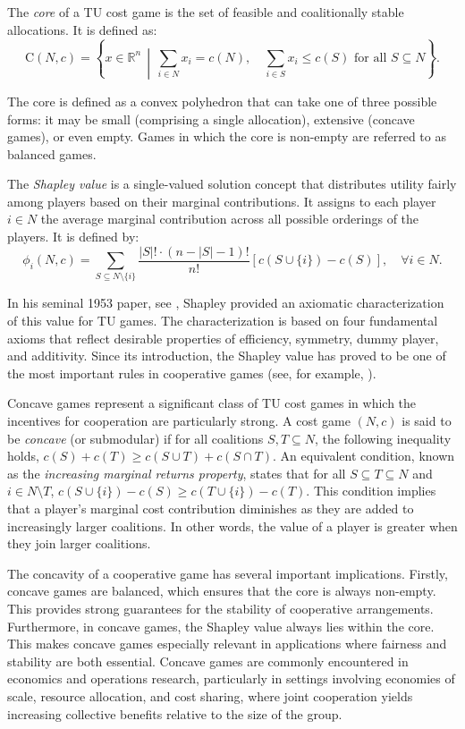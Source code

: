\documentclass[12pt]{article}
\begin{document}
\noindent The \textit{core} of a TU cost game is the set of feasible and coalitionally stable allocations. It is defined as:
\[
\text{C}(N,c) = \left\{ x \in \mathbb{R}^n \,\middle|\, \sum_{i \in N} x_i = c(N), \quad \sum_{i \in S} x_i \leq c(S) \text{ for all } S \subseteq N \right\}.
\]

\noindent The core is defined as a convex polyhedron that can take one of three possible forms: it may be small (comprising a single allocation), extensive (concave games), or even empty. Games in which the core is non-empty are referred to as balanced games.

\noindent The \textit{Shapley value} is a single-valued solution concept that distributes utility fairly among players based on their marginal contributions. It assigns to each player \( i \in N \) the average marginal contribution across all possible orderings of the players. It is defined by:
\[
\phi_i(N,c) = \sum_{S \subseteq N \setminus \{i\}} \frac{|S|! \cdot (n - |S| - 1)!}{n!} \left[ c(S \cup \{i\}) - c(S) \right], \quad \forall i \in N.
\]

\noindent In his seminal 1953 paper, see \cite{Shapley1953}, Shapley provided an axiomatic characterization of this value for TU games. The characterization is based on four fundamental axioms that reflect desirable properties of efficiency, symmetry, dummy player, and additivity. Since its introduction, the Shapley value has proved to be one of the most important rules in cooperative games (see, for example, \cite{flores2019evaluating}).

\noindent Concave games represent a significant class of TU cost games in which the incentives for cooperation are particularly strong. A cost game $(N,c)$ is said to be \textit{concave} (or submodular) if for all coalitions $S, T \subseteq N$, the following inequality holds, $c(S)+ c(T) \geq c(S \cup T) + c(S \cap T)$. An equivalent condition, known as the \textit{increasing marginal returns property}, states that for all  $S \subseteq T \subseteq N$ and $i \in N \setminus T$, $c(S \cup \{i\}) - c(S) \geq c(T \cup \{i\}) - c(T).$ This condition implies that a player's marginal cost contribution diminishes as they are added to increasingly larger coalitions. In other words, the value of a player is greater when they join larger coalitions.

\noindent The concavity of a cooperative game has several important implications. Firstly, concave games are balanced, which ensures that the core is always non-empty. This provides strong guarantees for the stability of cooperative arrangements. Furthermore, in concave games, the Shapley value always lies within the core. This makes concave games especially relevant in applications where fairness and stability are both essential. Concave games are commonly encountered in economics and operations research, particularly in settings involving economies of scale, resource allocation, and cost sharing, where joint cooperation yields increasing collective benefits relative to the size of the group.
\end{document}
